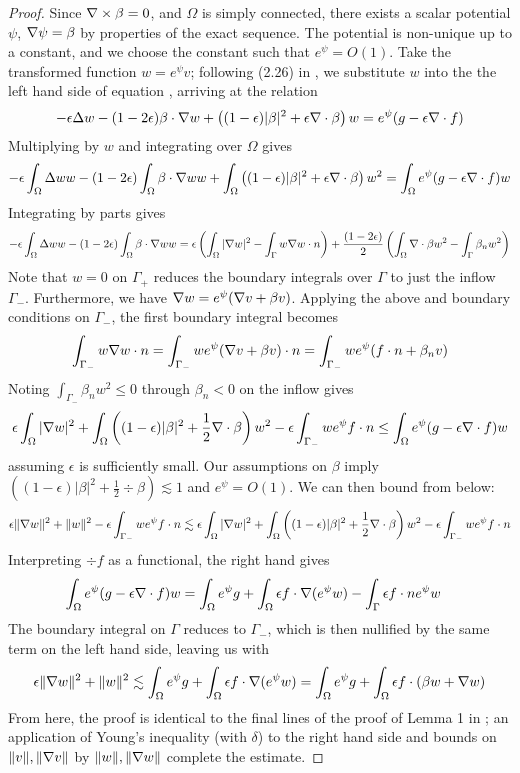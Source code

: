 \begin{proof}
Since $\curl \beta=0$, and $\Omega$ is simply connected, there exists a scalar potential $\psi$, $\grad \psi = \beta$ by properties of the exact sequence. The potential is non-unique up to a constant, and we choose the constant such that $e^\psi = O(1)$.  Take the transformed function $w = e^\psi v$; following (2.26) in \cite{DPGrobustness}, we substitute $w$ into the the left hand side of equation , arriving at the relation  
\[
-\epsilon \Delta w - (1-2\epsilon) \beta \cdot \grad w + \left((1-\epsilon)|\beta|^2 + \epsilon \div \beta\right) w = e^\psi (g-\epsilon \div f)
\]
Multiplying by $w$ and integrating over $\Omega$ gives
\[
-\epsilon \int_\Omega \Delta ww - (1-2\epsilon) \int_\Omega\beta \cdot \grad w w + \int_\Omega\left((1-\epsilon)|\beta|^2 + \epsilon \div \beta\right) w^2 = \int_\Omega e^\psi (g-\epsilon \div f) w
\]
Integrating by parts gives
\[
-\epsilon \int_\Omega \Delta ww - (1-2\epsilon) \int_\Omega\beta \cdot \grad w w = \epsilon \left( \int_\Omega |\grad w|^2- \int_{\Gamma} w \grad w \cdot n  \right) + \frac{(1-2\epsilon) }{2} \left(\int_\Omega \div \beta w^2 - \int_\Gamma\beta_n w^2 \right)
\]
Note that $w=0$ on $\Gamma_+$ reduces the boundary integrals over $\Gamma$ to just the inflow $\Gamma_-$.  Furthermore, we have $\grad w = e^\psi(\grad v + \beta v)$.  Applying the above and boundary conditions on $\Gamma_-$, the first boundary integral becomes
\[
\int_{\Gamma_-} w \grad w \cdot n = \int_{\Gamma_-} we^\psi(\grad v + \beta v)\cdot n =  \int_{\Gamma_-} we^\psi(f\cdot n + \beta_n v)
\]
Noting $\int_{\Gamma_-}\beta_n w^2 \leq 0$ through $\beta_n<0$ on the inflow gives
\[
\epsilon \int_\Omega |\grad w|^2 + \int_\Omega \left((1-\epsilon)|\beta|^2 + \frac{1}{2} \div \beta \right) w^2 - \epsilon \int_{\Gamma_-} we^\psi f\cdot n \leq \int_\Omega e^\psi (g-\epsilon \div f) w
\]
assuming $\epsilon$ is sufficiently small.  Our assumptions on $\beta$ imply $\left((1-\epsilon)|\beta|^2 + \frac{1}{2} \div \beta \right) \lesssim 1$ and $e^\psi = O(1)$. We can then bound from below:
\[
\epsilon \|\grad w\|^2 + \|w\|^2 - \epsilon \int_{\Gamma_-} we^\psi f\cdot n  \lesssim \epsilon \int_\Omega |\grad w|^2 + \int_\Omega \left((1-\epsilon)|\beta|^2 + \frac{1}{2} \div \beta \right) w^2 - \epsilon \int_{\Gamma_-} we^\psi f\cdot n 
\]
Interpreting $\div f$ as a functional, the right hand gives
\begin{align*}
\int_\Omega e^\psi (g-\epsilon \div f) w &= \int_\Omega e^\psi g + \int_\Omega \epsilon f \cdot \grad (e^\psi w) - \int_\Gamma \epsilon f\cdot n e^\psi w
\end{align*}
The boundary integral on $\Gamma$ reduces to $\Gamma_-$, which is then nullified by the same term on the left hand side, leaving us with 
\[
\epsilon \|\grad w\|^2 + \|w\|^2 \lesssim \int_\Omega e^\psi g + \int_\Omega \epsilon f \cdot \grad (e^\psi w) = \int_\Omega e^\psi g + \int_\Omega \epsilon f \cdot (\beta w + \grad w)
\]
From here, the proof is identical to the final lines of the proof of Lemma 1 in \cite{DPGrobustness}; an application of Young's inequality (with $\delta$) to the right hand side and bounds on $\|v\|, \|\grad v\|$ by $\|w\|,\|\grad w\|$ complete the estimate.  
\end{proof}

